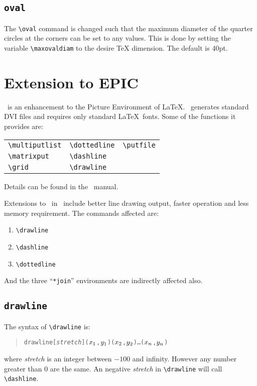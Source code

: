 \subsection{\tt \BS oval}
The \verb|\oval| command is changed such that the maximum
diameter of the quarter circles at the corners can be set to any
values. This is done by setting the variable \verb|\maxovaldiam|
to the desire \TeX{} dimension. The default is 40pt.


\clearpage


\section{Extension to EPIC}
\epic\ is an enhancement to the Picture Environment of \LaTeX.
\epic\ generates standard DVI files and requires only standard
\LaTeX\ fonts. Some of the functions it provides are:
\begin{center}
\begin{tabular}{lll}
\verb|\multiputlist| & \verb|\dottedline| & \verb|\putfile| \\
\verb|\matrixput| & \verb|\dashline| \\
\verb|\grid| & \verb|\drawline| \\
\end{tabular}
\end{center}
Details can be found in the \epic\ manual. 

Extensions to \epic\ in \eepic\ include better line drawing
output, faster operation and less memory requirement. The
commands affected are:
\begin{enumerate}\parskip=0pt
\item \verb|\drawline|
\item \verb|\dashline|
\item \verb|\dottedline|
\end{enumerate}
And the three ``\verb|*join|'' environments are indirectly
affected also.


\subsection{\tt \BS drawline}
The syntax of \verb|\drawline| is:
\begin{quote}
\begin{alltt}
\BS{}drawline[{\em{}stretch}](\(x\sb{1}\),\(y\sb{1}\))(\(x\sb{2}\),\(y\sb{2}\))\ldots(\(x\sb{n}\),\(y\sb{n}\))
\end{alltt}
\end{quote}
where {\em stretch} is an integer between $-100$ and infinity.
However any number greater than 0 are the same. An negative {\em
stretch} in \verb|\drawline| will call \verb|\dashline|.

